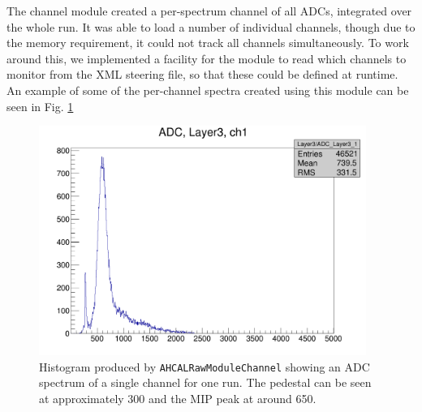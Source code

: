The channel module created a per-spectrum channel of all \acrshort{ADC}s, integrated over the whole run. It was able to load a number of individual channels, though due to the memory requirement, it could not track all channels simultaneously. To work around this, we implemented a facility for the module to read which channels to monitor from the \acrshort{XML} steering file, so that these could be defined at runtime. An example of some of the per-channel spectra created using this module can be seen in Fig. \ref{figure:aida/may2016/channelmodule}

\begin{figure}[p]
	\centering
	\includegraphics[width=0.95\textwidth]{../Pictures/ChannelModule-May2016.png} %
	\caption{Histogram produced by \texttt{AHCALRawModuleChannel} showing an \acrshort{ADC} spectrum of a single channel for one run. The pedestal can be seen at approximately 300 and the \acrshort{MIP} peak at around 650.}
	\label{figure:aida/may2016/channelmodule}
\end{figure}

